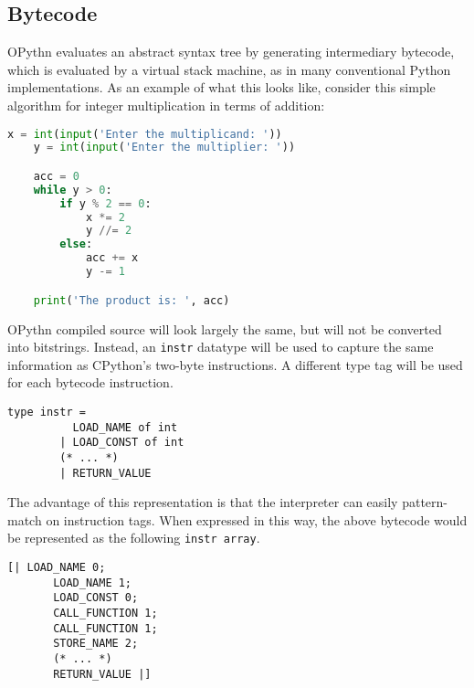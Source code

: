 \documentclass[11pt, twoside]{article}
\begin{document}
    \subsection{Bytecode}
    OPythn evaluates an abstract syntax tree by generating intermediary bytecode, which is evaluated by a virtual stack machine, as in many conventional Python implementations. As an example of what this looks like, consider this simple algorithm for integer multiplication in terms of addition:
    \begin{lstlisting}[language=python]
    x = int(input('Enter the multiplicand: '))
    y = int(input('Enter the multiplier: '))

    acc = 0
    while y > 0:
        if y % 2 == 0:
            x *= 2
            y //= 2
        else:
            acc += x
            y -= 1

    print('The product is: ', acc)
    \end{lstlisting}
    OPythn compiled source will look largely the same, but will not be converted into bitstrings. Instead, an \texttt{instr} datatype will be used to capture the same information as CPython's two-byte instructions. A different type tag will be used for each bytecode instruction.
    \begin{lstlisting}[language=caml]
        type instr =
          LOAD_NAME of int
        | LOAD_CONST of int
        (* ... *)
        | RETURN_VALUE
    \end{lstlisting}
    The advantage of this representation is that the interpreter can easily pattern-match on instruction tags. When expressed in this way, the above bytecode would be represented as the following \texttt{instr array}.
    \begin{lstlisting}[language=caml]
    [| LOAD_NAME 0;
       LOAD_NAME 1;
       LOAD_CONST 0;
       CALL_FUNCTION 1;
       CALL_FUNCTION 1;
       STORE_NAME 2;
       (* ... *)
       RETURN_VALUE |]
    \end{lstlisting}
\end{document}
